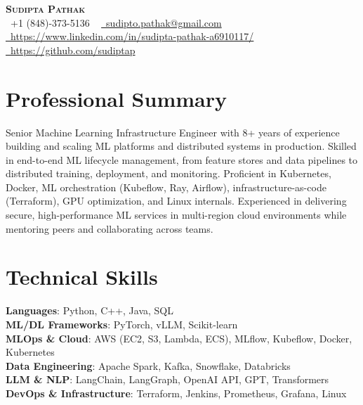 \documentclass[letterpaper,11pt]{article}
\begin{document}
\begin{center}
    \textbf{\Huge \scshape Sudipta Pathak} \\ \vspace{1pt}
    \small \raisebox{-0.1\height}\faPhone\ +1 (848)-373-5136 ~ 
    \href{mailto:sudipto.pathak@email.com}{\raisebox{-0.2\height}\faEnvelope\ sudipto.pathak@gmail.com} ~ 
    \href{https://www.linkedin.com/in/sudipta-pathak-a6910117/}{\raisebox{-0.2\height}\faLinkedin\ https://www.linkedin.com/in/sudipta-pathak-a6910117/} ~
    \href{https://github.com/sudiptap}{\raisebox{-0.2\height}\faGithub\ https://github.com/sudiptap}
    \vspace{-8pt}
\end{center}

\section{Professional Summary}
\small{Senior Machine Learning Infrastructure Engineer with 8+ years of experience building and scaling ML platforms and distributed systems in production. Skilled in end-to-end ML lifecycle management, from feature stores and data pipelines to distributed training, deployment, and monitoring. Proficient in Kubernetes, Docker, ML orchestration (Kubeflow, Ray, Airflow), infrastructure-as-code (Terraform), GPU optimization, and Linux internals. Experienced in delivering secure, high-performance ML services in multi-region cloud environments while mentoring peers and collaborating across teams.}

\section{Technical Skills}
\begin{itemize}[leftmargin=0.15in, label={}]
    \small{\item{
     \textbf{Languages}{: Python, C++, Java, SQL} \\
     \textbf{ML/DL Frameworks}{: PyTorch, vLLM, Scikit-learn} \\
     \textbf{MLOps \& Cloud}{: AWS (EC2, S3, Lambda, ECS), MLflow, Kubeflow, Docker, Kubernetes} \\
     \textbf{Data Engineering}{: Apache Spark, Kafka, Snowflake, Databricks} \\
     \textbf{LLM \& NLP}{: LangChain, LangGraph, OpenAI API, GPT, Transformers} \\
     \textbf{DevOps \& Infrastructure}{: Terraform, Jenkins, Prometheus, Grafana, Linux} \\
    }}
 \end{itemize}
\end{document}
